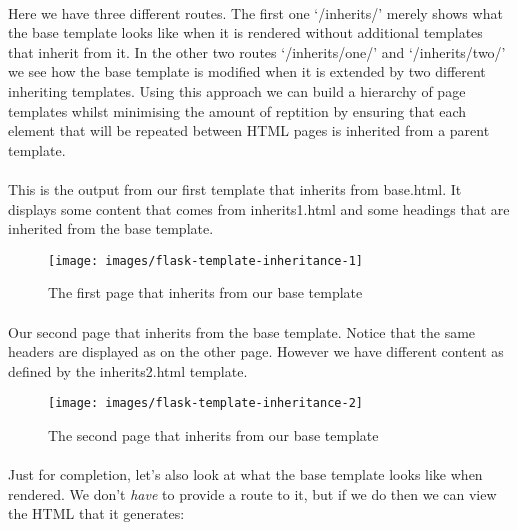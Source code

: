 \documentclass[12pt, a4paper, twoside]{book}
\begin{document}
\paragraph{} Here we have three different routes. The first one `/inherits/' merely shows what the base template looks like when it is rendered without additional templates that inherit from it. In the other two routes `/inherits/one/' and `/inherits/two/' we see how the base template is modified when it is extended by two different inheriting templates. Using this approach we can build a hierarchy of page templates whilst minimising the amount of reptition by ensuring that each element that will be repeated between HTML pages is inherited from a parent template.

\paragraph{} This is the output from our first template that inherits from base.html. It displays some content that comes from inherits1.html and some headings that are inherited from the base template.

\begin{figure}[H]
\centering
\texttt{[image: images/flask-template-inheritance-1]}
\caption{The first page that inherits from our base template}
\label{fig:flask-template-inheritance-1}
\end{figure}

\paragraph{} Our second page that inherits from the base template. Notice that the same headers are displayed as on the other page. However we have different content as defined by the inherits2.html template.

\begin{figure}[H]
\centering
\texttt{[image: images/flask-template-inheritance-2]}
\caption{The second page that inherits from our base template}
\label{fig:flask-template-inheritance-2}
\end{figure}

\paragraph{} Just for completion, let's also look at what the base template looks like when rendered. We don't \emph{have} to provide a route to it, but if we do then we can view the HTML that it generates:
\end{document}
